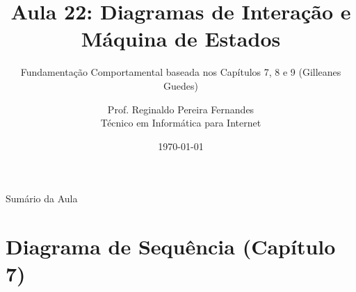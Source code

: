 \documentclass[10pt]{beamer}
\title[IFCE Tauá - Engenharia de Software]{Aula 22: Diagramas de Interação e Máquina de Estados}
\subtitle{Fundamentação Comportamental baseada nos Capítulos 7, 8 e 9 (Gilleanes Guedes)}
\author[Prof. Reginaldo Fernandes]{Prof. Reginaldo Pereira Fernandes\texorpdfstring{\\ \small{Técnico em Informática para Internet}}{}}
\institute[IFCE]{Instituto Federal do Ceará -- Campus Tauá}
\date{\today}
\begin{document}
\begin{frame}
    \titlepage
\end{frame}

\begin{frame}{Sumário da Aula}
    \tableofcontents
\end{frame}

\section{Diagrama de Sequência (Capítulo 7)}
\end{document}
